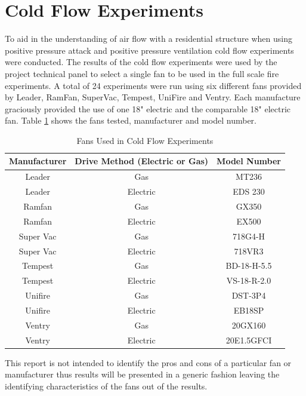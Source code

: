\documentclass{article}
\begin{document}
\section{Cold Flow Experiments}
To aid in the understanding of air flow with a residential structure when using positive pressure attack and positive pressure ventilation cold flow experiments were conducted. The results of the cold flow experiments were used by the project technical panel to select a single fan to be used in the full scale fire experiments. A total of 24 experiments were run using six different fans provided by Leader, RamFan, SuperVac, Tempest, UniFire and Ventry. Each manufacture graciously provided the use of one 18" electric and the comparable 18" electric fan. Table \ref{table:cold_flow_Fans} shows the fans tested, manufacturer and model number. 

\begin{table}[H]
	\centering
	\caption{Fans Used in Cold Flow Experiments}
	\begin{tabular}{|c|c|c|}
		\hline
		Manufacturer & Drive Method (Electric or Gas) & Model Number \\ \hline \hline
		Leader & Gas & MT236 \\ \hline
		Leader & Electric & EDS 230 \\ \hline
		Ramfan & Gas & GX350 \\ \hline
		Ramfan & Electric & EX500 \\ \hline
		Super Vac & Gas & 718G4-H \\ \hline
		Super Vac & Electric & 718VR3 \\ \hline
		Tempest & Gas & BD-18-H-5.5 \\ \hline
		Tempest & Electric & VS-18-R-2.0 \\ \hline
		Unifire & Gas & DST-3P4 \\ \hline
		Unifire & Electric & EB18SP \\ \hline
		Ventry & Gas & 20GX160 \\ \hline
		Ventry & Electric & 20E1.5GFCI \\ \hline
	\end{tabular}
	\label{table:cold_flow_Fans}
\end{table}

This report is not intended to identify the pros and cons of a particular fan or manufacturer thus results will be presented in a generic fashion leaving the identifying characteristics of the fans out of the results. 
\end{document}
